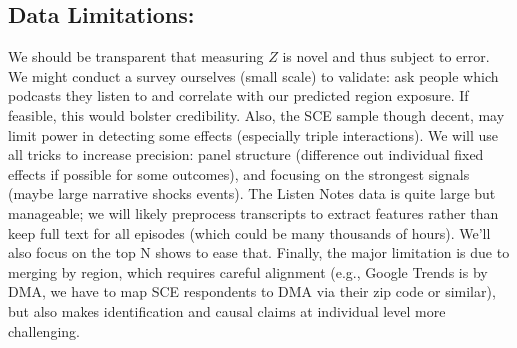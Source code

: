 \documentclass[12pt]{article}
\begin{document}
\subsection*{Data Limitations:}
We should be transparent that measuring $Z$ is novel and thus subject to error. We might conduct a survey ourselves (small scale) to validate: ask people which podcasts they listen to and correlate with our predicted region exposure. If feasible, this would bolster credibility.
Also, the SCE sample though decent, may limit power in detecting some effects (especially triple interactions). We will use all tricks to increase precision: panel structure (difference out individual fixed effects if possible for some outcomes), and focusing on the strongest signals (maybe large narrative shocks events).
The Listen Notes data is quite large but manageable; we will likely preprocess transcripts to extract features rather than keep full text for all episodes (which could be many thousands of hours). We'll also focus on the top N shows to ease that.
Finally, the major limitation is due to merging by region, which requires careful alignment (e.g., Google Trends is by DMA, we have to map SCE respondents to DMA via their zip code or similar), but also makes identification and causal claims at individual level more challenging.
\end{document}
